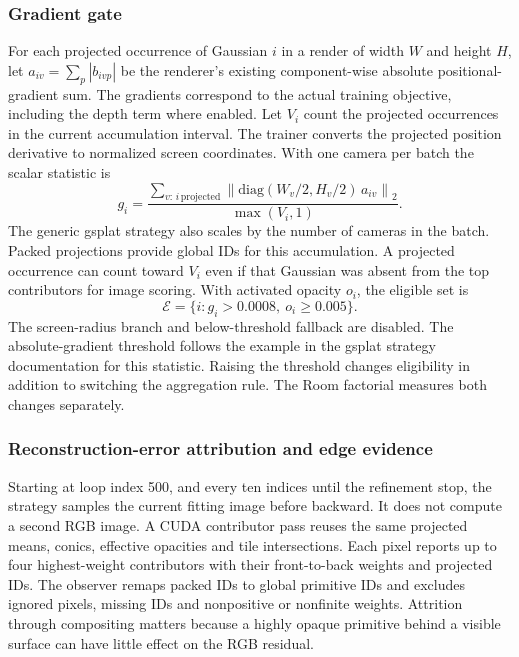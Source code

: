 \subsubsection{Gradient gate}
For each projected occurrence of Gaussian $i$ in a render of width $W$ and height $H$, let $a_{iv}=\sum_p |b_{ivp}|$ be the renderer's existing component-wise absolute positional-gradient sum. The gradients correspond to the actual training objective, including the depth term where enabled. Let $V_i$ count the projected occurrences in the current accumulation interval. The trainer converts the projected position derivative to normalized screen coordinates. With one camera per batch the scalar statistic is
\begin{equation}
 g_i=\frac{\displaystyle\sum_{v:\,i\,\mathrm{projected}}
        \left\|\mathrm{diag}(W_v/2,H_v/2)\,a_{iv}\right\|_2}
        {\max(V_i,1)} .
\end{equation}
The generic gsplat strategy also scales by the number of cameras in the batch. Packed projections provide global IDs for this accumulation. A projected occurrence can count toward $V_i$ even if that Gaussian was absent from the top contributors for image scoring. With activated opacity $o_i$, the eligible set is
\begin{equation}
 \mathcal E=\{i:g_i>0.0008,\ o_i\geq0.005\}.
\end{equation}
The screen-radius branch and below-threshold fallback are disabled. The absolute-gradient threshold follows the example in the gsplat strategy documentation for this statistic. Raising the threshold changes eligibility in addition to switching the aggregation rule. The Room factorial measures both changes separately.

\subsubsection{Reconstruction-error attribution and edge evidence}
Starting at loop index 500, and every ten indices until the refinement stop, the strategy samples the current fitting image before backward. It does not compute a second RGB image. A CUDA contributor pass reuses the same projected means, conics, effective opacities and tile intersections. Each pixel reports up to four highest-weight contributors with their front-to-back weights and projected IDs. The observer remaps packed IDs to global primitive IDs and excludes ignored pixels, missing IDs and nonpositive or nonfinite weights. Attrition through compositing matters because a highly opaque primitive behind a visible surface can have little effect on the RGB residual.

